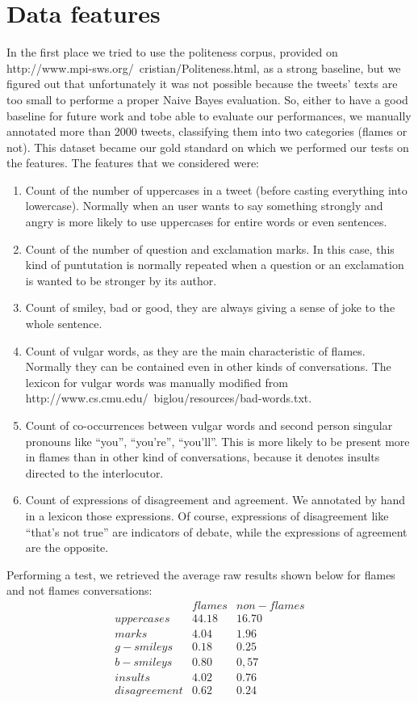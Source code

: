 \documentclass[a4paper,10pt, english]{report}
\begin{document}
\section{Data features}
In the first place we tried to use the politeness corpus, provided on http://www.mpi-sws.org/~cristian/Politeness.html, as a strong baseline, but we figured out that unfortunately it was not possible because the tweets' texts are too small to performe a proper Naive Bayes evaluation.
So, either to have a good baseline for future work and tobe able to evaluate our performances, we manually annotated more than 2000 tweets, classifying them into two categories (flames or not).
This dataset became our gold standard on which we performed our tests on the features.
The features that we considered were:
\begin{enumerate}
 \item Count of the number of uppercases in a tweet (before casting everything into lowercase). Normally when an user wants to say something strongly and angry is more likely to use uppercases for entire words or even sentences.
 \item Count of the number of question and exclamation marks. In this case, this kind of puntutation is normally repeated when a question or an exclamation is wanted to be stronger by its author.
 \item Count of smiley, bad or good, they are always giving a sense of joke to the whole sentence.
 \item Count of vulgar words, as they are the main characteristic of flames. Normally they can be contained even in other kinds of conversations. The lexicon for vulgar words was manually modified from http://www.cs.cmu.edu/~biglou/resources/bad-words.txt.
 \item Count of co-occurrences between vulgar words and second person singular pronouns like ``you'', ``you're'', ``you'll''. This is more likely to be present more in flames than in other kind of conversations, because it denotes insults directed to the interlocutor.
 \item Count of expressions of disagreement and agreement. We annotated by hand in a lexicon those expressions. Of course, expressions of disagreement like ``that's not true'' are indicators of debate, while the expressions of agreement are the opposite. 
\end{enumerate}
Performing a test, we retrieved the average raw results shown below for flames and not flames conversations:
$$
 \begin{array}{lrr}
 &flames&non-flames\\
 uppercases&44.18&16.70\\
 marks&4.04&1.96\\
 g-smileys&0.18&0.25\\
 b-smileys&0.80&0,57\\
 insults&4.02&0.76\\
 disagreement&0.62&0.24\\
 \end{array}
$$
\end{document}
